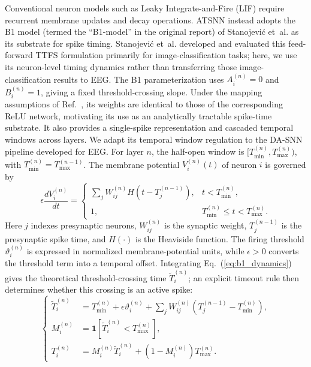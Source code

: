 ﻿\documentclass{nsr}
\begin{document}
Conventional neuron models such as Leaky Integrate-and-Fire (LIF) \cite{ref79} require recurrent membrane updates and decay operations. ATSNN instead adopts the B1 model (termed the ``B1-model'' in the original report) of Stanojevi\'{c} et~al. \cite{ref46} as its substrate for spike timing. Stanojevi\'{c} et~al. developed and evaluated this feed-forward TTFS formulation primarily for image-classification tasks; here, we use its neuron-level timing dynamics rather than transferring those image-classification results to EEG. The B1 parameterization uses $A_i^{(n)}=0$ and $B_i^{(n)}=1$, giving a fixed threshold-crossing slope. Under the mapping assumptions of Ref.~\cite{ref46}, its weights are identical to those of the corresponding ReLU network, motivating its use as an analytically tractable spike-time substrate. It also provides a single-spike representation and cascaded temporal windows across layers. We adapt its temporal window regulation to the DA-SNN pipeline developed for EEG. For layer $n$, the half-open window is $[T_{\min}^{(n)},T_{\max}^{(n)})$, with $T_{\min}^{(n)}=T_{\max}^{(n-1)}$. The membrane potential $V_i^{(n)}(t)$ of neuron $i$ is governed by
\begin{equation}
\label{eq:b1_dynamics}
\epsilon \frac{dV_i^{(n)}}{dt} =
\begin{cases}
\displaystyle \sum\nolimits_j W_{ij}^{(n)} H\!\left(t-T_j^{(n-1)}\right), & t < T_{\min}^{(n)},\\[0.4em]
1, & T_{\min}^{(n)} \le t < T_{\max}^{(n)}.
\end{cases}
\end{equation}
Here $j$ indexes presynaptic neurons, $W_{ij}^{(n)}$ is the synaptic weight, $T_j^{(n-1)}$ is the presynaptic spike time, and $H(\cdot)$ is the Heaviside function. The firing threshold $\vartheta_i^{(n)}$ is expressed in normalized membrane-potential units, while $\epsilon>0$ converts the threshold term into a temporal offset. Integrating Eq.~(\ref{eq:b1_dynamics}) gives the theoretical threshold-crossing time $\tilde{T}_i^{(n)}$; an explicit timeout rule then determines whether this crossing is an active spike:
\begin{equation}
\label{eq:b1_combined}
\left\{
\begin{aligned}
\tilde{T}_i^{(n)} &= T_{\min}^{(n)} + \epsilon \vartheta_i^{(n)} + \sum\nolimits_j W_{ij}^{(n)}\!\left(T_j^{(n-1)} - T_{\min}^{(n)}\right), \\
M_i^{(n)} &= \mathbf{1}\!\left[\tilde{T}_i^{(n)} < T_{\max}^{(n)}\right], \\
T_i^{(n)} &= M_i^{(n)}\tilde{T}_i^{(n)} + \left(1-M_i^{(n)}\right)T_{\max}^{(n)}.
\end{aligned}
\right.
\end{equation}
\end{document}
